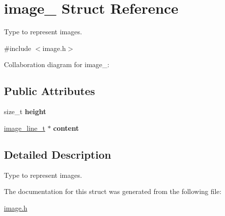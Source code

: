 \hypertarget{structimage__}{}\section{image\+\_\+ Struct Reference}
\label{structimage__}


Type to represent images.  




{\ttfamily \#include $<$image.\+h$>$}



Collaboration diagram for image\+\_\+\+:
\subsection*{Public Attributes}
\begin{DoxyCompactItemize}
\item 
\mbox{\label{structimage___a9f47d53623fb289e760824d5fa5b6284}} 
size\+\_\+t {\bfseries height}
\item 
\mbox{\label{structimage___aa88ea70595dd0651d47d66f3218afc6f}} 
\hyperlink{structimage__line__}{image\+\_\+line\+\_\+t} $\ast$ {\bfseries content}
\end{DoxyCompactItemize}


\subsection{Detailed Description}
Type to represent images. 

The documentation for this struct was generated from the following file\+:\begin{DoxyCompactItemize}
\item 
\hyperlink{image_8h}{image.\+h}\end{DoxyCompactItemize}
